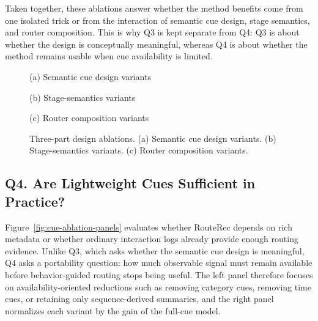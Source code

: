 \documentclass[sigconf,review,anonymous]{acmart}
\newcommand{\placeholderpanel}[1]{\fbox{\rule{0pt}{#1}\rule{0.92\linewidth}{0pt}}}
\begin{document}
Taken together, these ablations answer whether the method benefits come from one isolated trick or from the interaction of semantic cue design, stage semantics, and router composition. This is why Q3 is kept separate from Q4: Q3 is about whether the design is conceptually meaningful, whereas Q4 is about whether the method remains usable when cue availability is limited.

\begin{figure}[!t]
  \centering
  \begin{minipage}[t]{0.31\textwidth}
    \centering
    \placeholderpanel{1.05in}

    \vspace{0.35em}
    {\footnotesize (a) Semantic cue design variants}
  \end{minipage}\hfill
  \begin{minipage}[t]{0.31\textwidth}
    \centering
    \placeholderpanel{1.05in}

    \vspace{0.35em}
    {\footnotesize (b) Stage-semantics variants}
  \end{minipage}\hfill
  \begin{minipage}[t]{0.31\textwidth}
    \centering
    \placeholderpanel{1.05in}

    \vspace{0.35em}
    {\footnotesize (c) Router composition variants}
  \end{minipage}
  \caption{Three-part design ablations. (a) Semantic cue design variants. (b) Stage-semantics variants. (c) Router composition variants.}
  \label{fig:stage-structure-panels}
\end{figure}

\subsection{Q4. Are Lightweight Cues Sufficient in Practice?}
\label{sec:lightweight-cues}
Figure~\ref{fig:cue-ablation-panels} evaluates whether RouteRec depends on rich metadata or whether ordinary interaction logs already provide enough routing evidence. Unlike Q3, which asks whether the semantic cue design is meaningful, Q4 asks a portability question: how much observable signal must remain available before behavior-guided routing stops being useful. The left panel therefore focuses on availability-oriented reductions such as removing category cues, removing time cues, or retaining only sequence-derived summaries, and the right panel normalizes each variant by the gain of the full-cue model.
\end{document}
